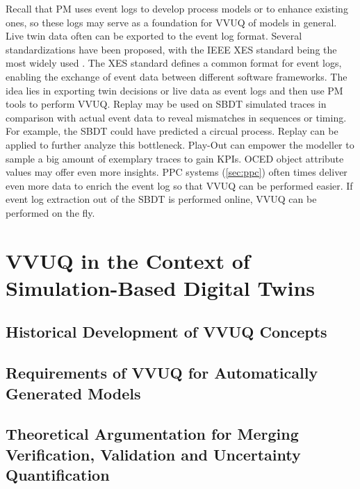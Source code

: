 Recall that PM uses event logs to develop process models or to enhance existing ones, so these logs may serve as a foundation for VVUQ of models in general. Live twin data often can be exported to the event log format. Several standardizations have been proposed, with the IEEE XES standard being the most widely used \parencite{van2016data}. The XES standard defines a common format for event logs, enabling the exchange of event data between different software frameworks. The idea lies in exporting twin decisions or live data as event logs and then use PM tools to perform VVUQ.
Replay may be used on SBDT simulated traces in comparison with actual event data to reveal mismatches in sequences or timing. For example, the SBDT could have predicted a circual process. Replay can be applied to further analyze this bottleneck. Play-Out can empower the modeller to sample a big amount of exemplary traces to gain KPIs. OCED object attribute values may offer even more insights.
PPC systems (\autoref{sec:ppc}) often times deliver even more data to enrich the event log so that VVUQ can be performed easier. If event log extraction out of the SBDT is performed online, VVUQ can be performed on the fly.

\section{VVUQ in the Context of Simulation-Based Digital Twins}
\label{sec:vvuq-sbdt}


\subsection{Historical Development of VVUQ Concepts}
\label{sec:historical-development}

\subsection{Requirements of VVUQ for Automatically Generated Models}
\label{sec:requirements-automatically-generated-models}

\subsection{Theoretical Argumentation for Merging Verification, Validation and Uncertainty Quantification}
\label{sec:merging-vvuq}

